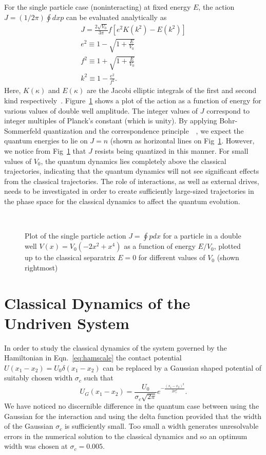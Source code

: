 For the single particle case (noninteracting) at fixed energy $E$, the action $J=(1/2\pi) \oint dx p$ can be evaluated analytically as
\begin{eqnarray}
J = \frac{2\sqrt{V_0}}{3\pi} f \left[ e^2 K(k^2) -E(k^2) \right]\\
e^2 \equiv 1-\sqrt{1+\frac{E}{V_0}}\\
f^2 \equiv 1+\sqrt{1+\frac{E}{V_0}}\\
k^2 \equiv 1-\frac{e^2}{f^2}.
\end{eqnarray}
Here, $K(\kappa)$ and $E(\kappa)$ are the Jacobi elliptic integrals of the first and second kind respectively~\cite{reichl-appendix}. Figure~\ref{fig:actions} shows a plot of the action as a function of energy for various values of double well amplitude. The integer values of $J$ correspond to integer multiples of Planck's constant (which is unity). By applying Bohr-Sommerfeld quantization and the correspondence principle~\cite{bohr:sommerfeld}~\cite{terhaar}, we expect the quantum energies to lie on $J=n$ (shown as horizontal lines on Fig~\ref{fig:actions}. However, we notice from Fig~\ref{fig:actions} that $J$ resists being quantized in this manner. For small values of $V_0$, the quantum dynamics lies completely above the classical trajectories, indicating that the quantum dynamics will not see significant effects from the classical trajectories. The role of interactions, as well as external drives, needs to be investigated in order to create sufficiently large-sized trajectories in the phase space for the classical dynamics to affect the quantum evolution.
\begin{figure}
\ 
\caption{Plot of the single particle action $J=\oint p dx$ for a particle in a double well $V(x)=V_0 (-2x^2+x^4)$ as a function of energy $E/V_0$, plotted up to the classical separatrix $E=0$ for different values of $V_0$ (shown rightmost)}
\label{fig:actions}
\end{figure}
%
%
\section{\label{sec:3} Classical Dynamics of the Undriven System}
%
%
\label{chapter-dblwell:section:classicaldyn}
In order to study the classical dynamics of the system governed by the Hamiltonian in 
Eqn.~\ref{eq:hamscale} the contact potential $U(x_1-x_2)=U_0 \delta(x_1-x_2)$ can be replaced by a Gaussian shaped potential of suitably chosen width $\sigma_c$ such that 
%
\begin{equation}
U_G(x_1-x_2)=\frac{U_0}{\sigma_c \sqrt{2\pi}} e^{-\frac{(x_1-x_2)^2}{2\sigma^2_c}}.
\end{equation}
%
We have noticed no discernible difference in the quantum case between using the Gaussian for the interaction and using the delta function provided that the width of the  Gaussian $\sigma_c$ is sufficiently small. Too small a width generates unresolvable errors in the numerical solution to the classical dynamics and so an optimum width was chosen at $\sigma_c = 0.005$. 

